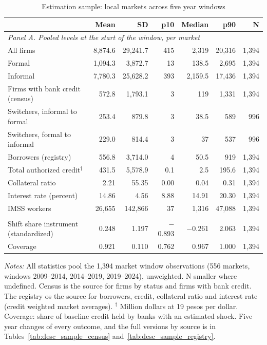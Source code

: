 \documentclass[12pt]{article}
\begin{document}
\begin{table}[H]
\centering
\caption{Estimation sample: local markets across five year windows}
\label{tab:desc_sample}
\begin{threeparttable}
\small
\setlength{\tabcolsep}{5pt}
\renewcommand{\arraystretch}{0.9}
\begin{tabular}{l r r r r r r}
\toprule
 & Mean & SD & p10 & Median & p90 & N \\
\midrule
\multicolumn{7}{l}{\textit{Panel A. Pooled levels at the start of the window, per market}} \\
All firms & 8,874.6 & 29,241.7 & 415 & 2,319 & 20,316 & 1,394 \\
\quad Formal & 1,094.3 & 3,872.7 & 13 & 138.5 & 2,695 & 1,394 \\
\quad Informal & 7,780.3 & 25,628.2 & 393 & 2,159.5 & 17,436 & 1,394 \\
Firms with bank credit (census) & 572.8 & 1,793.1 & 3 & 119 & 1,331 & 1,394 \\
Switchers, informal to formal & 253.4 & 879.8 & 3 & 38.5 & 589 & 996 \\
Switchers, formal to informal & 229.0 & 814.4 & 3 & 37 & 537 & 996 \\
Borrowers (registry) & 556.8 & 3,714.0 & 4 & 50.5 & 919 & 1,394 \\
Total authorized credit$^{\dagger}$ & 431.5 & 5,578.9 & 0.1 & 2.5 & 195.6 & 1,394 \\
Collateral ratio & 2.21 & 55.35 & 0.00 & 0.04 & 0.31 & 1,394 \\
Interest rate (percent) & 14.86 & 4.56 & 8.88 & 14.91 & 20.30 & 1,394 \\
IMSS workers & 26,655 & 142,866 & 37 & 1,316 & 47,088 & 1,394 \\
\addlinespace[3pt]
\multicolumn{7}{l}{\textit{Panel B. Instrument}} \\
Shift share instrument (standardized) & 0.248 & 1.197 & $-$0.893 & $-$0.261 & 2.063 & 1,394 \\
Coverage & 0.921 & 0.110 & 0.762 & 0.967 & 1.000 & 1,394 \\
\bottomrule
\end{tabular}
\begin{tablenotes}[flushleft]
\footnotesize
\item \textit{Notes:} All statistics pool the 1,394 market window observations (556 markets, windows 2009--2014, 2014--2019, 2019--2024), unweighted. N smaller where undefined. Census is the source for firms by status and firms with bank credit. The registry os the source for borrowers, credit, collateral ratio and interest rate (credit weighted market averages). $^{\dagger}$ Million dollars at 19 pesos per dollar. Coverage: share of baseline credit held by banks with an estimated shock. Five year changes of every outcome, and the full versions by source is in Tables~\ref{tab:desc_sample_census} and~\ref{tab:desc_sample_registry}.
\end{tablenotes}
\end{threeparttable}
\end{table}
\end{document}
